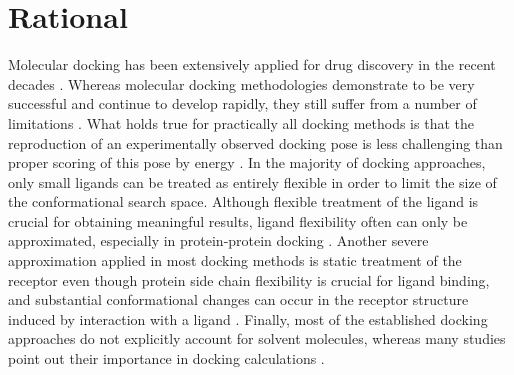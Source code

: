 
\section{Rational}

Molecular docking has been extensively applied for drug
discovery in the recent decades \cite{klebe_recent_2000,
cheng_structure-based_2012}. Whereas molecular docking methodologies demonstrate
to be very successful and continue to develop rapidly, they still suffer from a
number of limitations \cite{moreira_proteinprotein_2010,
andrusier_principles_2008,lensink_docking_2010}. What holds true for practically
all docking methods is that the reproduction of an experimentally observed
docking pose is less challenging than proper scoring of this pose by energy
\cite{kim_assessment_2008, plewczynski_can_2011,smith_csar_2011}. In the
majority of docking approaches, only small ligands can be treated as entirely
flexible in order to limit the size of the conformational search space. Although
flexible treatment of the ligand is crucial for obtaining meaningful results,
ligand flexibility often can only be approximated, especially in protein-protein
docking \cite{ritchie_recent_2008}. Another severe approximation applied in most
docking methods is static treatment of the receptor even though protein side
chain flexibility is crucial for ligand binding, and substantial conformational
changes can occur in the receptor structure induced by interaction with a ligand
\cite{gunasekaran_how_2007,gutteridge_conformational_2005}. Finally, most of the
established docking approaches do not explicitly account for solvent molecules,
whereas many studies point out their importance in docking calculations
\cite{van_dijk_solvated_2006,baron_water_2010,roberts_ligandprotein_2008,
thilagavathi_ligand-protein_2010}.

